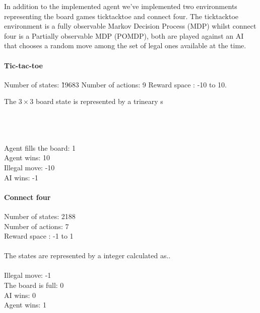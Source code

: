In addition to the implemented agent we've implemented two environments representing the board games ticktacktoe and connect four. The ticktacktoe environment is a fully observable Markov Decision Process (MDP) whilst connect four is a Partially observable MDP (POMDP), both are played against an AI that chooses a random move among the set of legal ones available at the time.


\paragraph{Tic-tac-toe}
Number of states: \~19683
Number of actions: 9
Reward space : -10 to 10.

The $3\times3$ board state is represented by a trineary s


\\
\\
\\
Agent fills the board: 1\\
Agent wins: 10\\
Illegal move: -10\\
AI wins: -1
\paragraph{Connect four}
Number of states: 2188 \\
Number of actions: 7\\
Reward space : -1 to 1\\
\\
The states are represented by a integer calculated as..\\
\\
Illegal move: -1\\
The board is full:  0\\
AI wins: 0\\
Agent wins: 1
